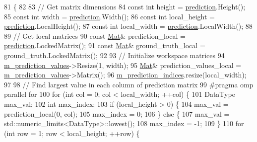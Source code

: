 \begin{DoxyCode}
81                                                                                        \{
82 
83   \textcolor{comment}{// Get matrix dimensions}
84   \textcolor{keyword}{const} \textcolor{keywordtype}{int} height = \hyperlink{base_8hpp_a2781a159088df64ed7d47cc91c4dc0a8ac41b9ec75e920b610e8907e066074b30}{prediction}.Height();
85   \textcolor{keyword}{const} \textcolor{keywordtype}{int} width = \hyperlink{base_8hpp_a2781a159088df64ed7d47cc91c4dc0a8ac41b9ec75e920b610e8907e066074b30}{prediction}.Width();
86   \textcolor{keyword}{const} \textcolor{keywordtype}{int} local\_height = \hyperlink{base_8hpp_a2781a159088df64ed7d47cc91c4dc0a8ac41b9ec75e920b610e8907e066074b30}{prediction}.LocalHeight();
87   \textcolor{keyword}{const} \textcolor{keywordtype}{int} local\_width = \hyperlink{base_8hpp_a2781a159088df64ed7d47cc91c4dc0a8ac41b9ec75e920b610e8907e066074b30}{prediction}.LocalWidth();
88 
89   \textcolor{comment}{// Get local matrices}
90   \textcolor{keyword}{const} \hyperlink{base_8hpp_a68f11fdc31b62516cb310831bbe54d73}{Mat}& prediction\_local = \hyperlink{base_8hpp_a2781a159088df64ed7d47cc91c4dc0a8ac41b9ec75e920b610e8907e066074b30}{prediction}.LockedMatrix();
91   \textcolor{keyword}{const} \hyperlink{base_8hpp_a68f11fdc31b62516cb310831bbe54d73}{Mat}& ground\_truth\_local = ground\_truth.LockedMatrix();
92 
93   \textcolor{comment}{// Initialize workspace matrices}
94   \hyperlink{classlbann_1_1categorical__accuracy__metric_a796e50da721050d30e0cea709484154e}{m\_prediction\_values}->Resize(1, width);
95   \hyperlink{base_8hpp_a68f11fdc31b62516cb310831bbe54d73}{Mat}& prediction\_values\_local = \hyperlink{classlbann_1_1categorical__accuracy__metric_a796e50da721050d30e0cea709484154e}{m\_prediction\_values}->Matrix();
96   \hyperlink{classlbann_1_1categorical__accuracy__metric_a369a86a91f08f3ad3b12b870ccf2e427}{m\_prediction\_indices}.resize(local\_width);
97 
98   \textcolor{comment}{// Find largest value in each column of prediction matrix}
99 \textcolor{preprocessor}{  #pragma omp parallel for}
100   \textcolor{keywordflow}{for} (\textcolor{keywordtype}{int} col = 0; col < local\_width; ++col) \{
101     DataType max\_val;
102     \textcolor{keywordtype}{int} max\_index;
103     \textcolor{keywordflow}{if} (local\_height > 0) \{
104       max\_val = prediction\_local(0, col);
105       max\_index = 0;
106     \} \textcolor{keywordflow}{else} \{
107       max\_val = std::numeric\_limits<DataType>::lowest();
108       max\_index = -1;
109     \}
110     \textcolor{keywordflow}{for} (\textcolor{keywordtype}{int} row = 1; row < local\_height; ++row) \{

\end{DoxyCode}
